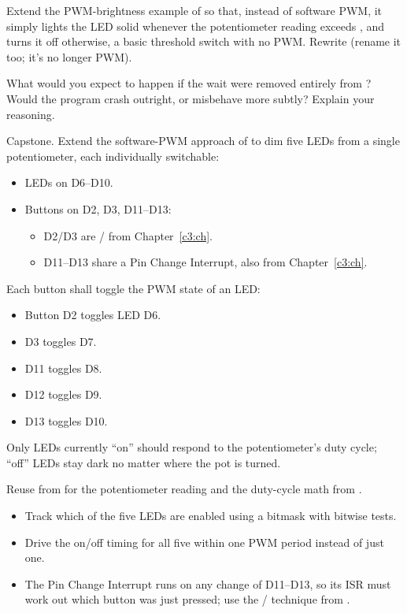 \label{c4:ex:5}
Extend the PWM-brightness example of  so that, instead of software PWM, it simply
lights the LED solid whenever the potentiometer reading exceeds , and turns it off
otherwise, a basic threshold switch with no PWM. Rewrite  (rename it
too; it's no longer PWM).

\label{c4:ex:6}
What would you expect to happen if the  wait were
removed entirely from ? Would the program crash outright, or misbehave more
subtly? Explain your reasoning.

\label{c4:ex:7}
Capstone. Extend the software-PWM approach of  to dim five LEDs from a single
potentiometer, each individually switchable:
\begin{itemize}
  \item LEDs on D6--D10.
  \item Buttons on D2, D3, D11--D13:
    \begin{itemize}
      \item D2/D3 are / from Chapter~\ref{c3:ch}.
      \item D11--D13 share a Pin Change Interrupt, also from Chapter~\ref{c3:ch}.
    \end{itemize}
\end{itemize}
Each button shall toggle the PWM state of an LED:
\begin{itemize}
  \item Button D2 toggles LED D6.
  \item D3 toggles D7.
  \item D11 toggles D8.
  \item D12 toggles D9.
  \item D13 toggles D10.
\end{itemize}
Only LEDs currently ``on'' should respond to the potentiometer's duty cycle; ``off'' LEDs stay dark
no matter where the pot is turned.

Reuse  from  for the potentiometer reading and the duty-cycle math
from .
\begin{itemize}
  \item Track which of the five LEDs are enabled using a  bitmask with bitwise tests.
  \item Drive the on/off timing for all five within one PWM period instead of just one.
  \item The Pin Change Interrupt runs on any change of D11--D13, so its ISR must work out which
    button was just pressed; use the / technique from .
\end{itemize}
